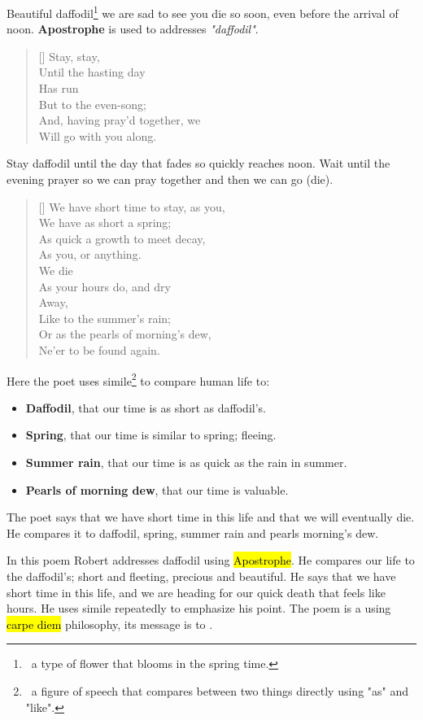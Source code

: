 Beautiful daffodil\footnote{\, a type of flower that blooms in the spring time.} we 
are sad to see you die so soon, even before the arrival of noon. \textbf{Apostrophe}
is used to addresses \textit{"daffodil"}.

\begin{verse}[\versewidth]
{\fontverse
Stay, stay,\\
Until the hasting day\\
Has run\\
But to the even-song;\\
And, having pray'd together, we\\
Will go with you along.
} 
\end{verse}

Stay daffodil until the day that fades so quickly reaches noon. Wait until the evening 
prayer so we can pray together and then we can go (die). 

\begin{verse}[\versewidth]
{\fontverse
We have short time to stay, as you,\\
We have as short a spring;\\
As quick a growth to meet decay,\\
As you, or anything.\\
We die\\
As your hours do, and dry\\
Away,\\
Like to the summer's rain;\\
Or as the pearls of morning's dew,\\
Ne'er to be found again.
} 
\end{verse}

Here the poet uses simile\footnote{\, a figure of speech that compares between 
two things directly using "as" and "like".} to compare human life to:

\begin{itemize}
  \item \textbf{Daffodil}, that our time is as short as daffodil's.
  \item \textbf{Spring}, that our time is similar to spring; fleeing.
  \item \textbf{Summer rain}, that our time is as quick as the rain in summer.
  \item \textbf{Pearls of morning dew}, that our time is valuable.
\end{itemize}

The poet says that we have short time in this life and that we will eventually die. 
He compares it to daffodil, spring, summer rain and pearls morning's dew. 

In this poem Robert addresses daffodil using \hl{Apostrophe}. He compares
our life to the daffodil's; short and fleeting, precious and beautiful.
He says that we have short time in this life, and we are heading for our quick
death that feels like hours. He uses simile repeatedly to emphasize his point.
The poem is a  using \hl{carpe diem} philosophy, its message is to
.

